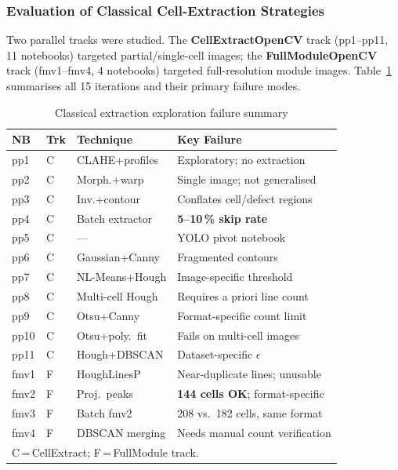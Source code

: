 \documentclass[conference]{IEEEtran}
\begin{document}
\subsubsection{Evaluation of Classical Cell-Extraction Strategies}

Two parallel tracks were studied. The \textbf{CellExtractOpenCV} track (pp1--pp11, 11 notebooks) targeted partial/single-cell images; the \textbf{FullModuleOpenCV} track (fmv1--fmv4, 4 notebooks) targeted full-resolution module images. Table~\ref{tab:classical_all} summarises all 15 iterations and their primary failure modes.

\begin{table}[t]
  \caption{Classical extraction exploration failure summary}
  \label{tab:classical_all}
  \begin{center}
  \renewcommand{\arraystretch}{1.0}\scriptsize
  \begin{tabular}{p{0.55cm}p{0.35cm}p{1.65cm}p{3.55cm}}
    \toprule
    \textbf{NB} & \textbf{Trk} & \textbf{Technique} & \textbf{Key Failure}\\
    \midrule
    pp1  & C & CLAHE+profiles   & Exploratory; no extraction\\
    pp2  & C & Morph.+warp      & Single image; not generalised\\
    pp3  & C & Inv.+contour     & Conflates cell/defect regions\\
    pp4  & C & Batch extractor  & \textbf{5--10\,\% skip rate}\\
    pp5  & C & ---              & YOLO pivot notebook\\
    pp6  & C & Gaussian+Canny   & Fragmented contours\\
    pp7  & C & NL-Means+Hough   & Image-specific threshold\\
    pp8  & C & Multi-cell Hough & Requires a priori line count\\
    pp9  & C & Otsu+Canny       & Format-specific count limit\\
    pp10 & C & Otsu+poly.\ fit  & Fails on multi-cell images\\
    pp11 & C & Hough+DBSCAN     & Dataset-specific $\epsilon$\\
    \midrule
    fmv1 & F & HoughLinesP      & Near-duplicate lines; unusable\\
    fmv2 & F & Proj.\ peaks     & \textbf{144 cells OK}; format-specific\\
    fmv3 & F & Batch fmv2       & 208 vs.\ 182 cells, same format\\
    fmv4 & F & DBSCAN merging   & Needs manual count verification\\
    \bottomrule
    \multicolumn{4}{l}{\scriptsize C\,=\,CellExtract; F\,=\,FullModule track.}
  \end{tabular}
  \end{center}
\end{table}
\end{document}
